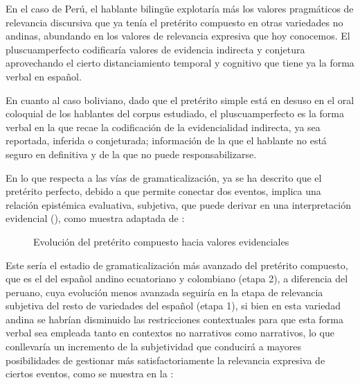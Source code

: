 \documentclass[output=paper]{../langscibook}
\begin{document}
En el caso de Perú, el hablante bilingüe explotaría más los valores pragmáticos de relevancia discursiva que ya tenía el pretérito compuesto en otras variedades no andinas, abundando en los valores de relevancia expresiva que hoy conocemos. El pluscuamperfecto codificaría valores de evidencia indirecta y conjetura aprovechando el cierto distanciamiento temporal y cognitivo que tiene ya la forma verbal en español.

En cuanto al caso boliviano, dado que el pretérito simple está en desuso en el oral coloquial de los hablantes del corpus estudiado, el pluscuamperfecto es la forma verbal en la que recae la codificación de la evidencialidad indirecta, ya sea reportada, inferida o conjeturada; información de la que el hablante no está seguro en definitiva y de la que no puede responsabilizarse.

En lo que respecta a las vías de gramaticalización, ya se ha descrito que el pretérito perfecto, debido a que permite conectar dos eventos, implica una relación epistémica evaluativa, subjetiva, que puede derivar en una interpretación evidencial (\citealt{Aikhenvald2004,BybeeEtAl1994,Dik1997}), como muestra  adaptada de \citet[105]{BybeeEtAl1994}:


\begin{figure}

\caption{\label{fig:palacios:1}Evolución del pretérito compuesto hacia valores evidenciales}
\end{figure}

Este sería el estadio de gramaticalización más avanzado del pretérito compuesto, que es el del español andino ecuatoriano y colombiano (etapa 2), a diferencia del peruano, cuya evolución menos avanzada seguiría en la etapa de relevancia subjetiva del resto de variedades del español (etapa 1), si bien en esta variedad andina se habrían disminuido las restricciones contextuales para que esta forma verbal sea empleada tanto en contextos no narrativos como narrativos, lo que conllevaría un incremento de la subjetividad que conducirá a mayores posibilidades de gestionar más satisfactoriamente la relevancia expresiva de ciertos eventos, como se muestra en la :
\end{document}
